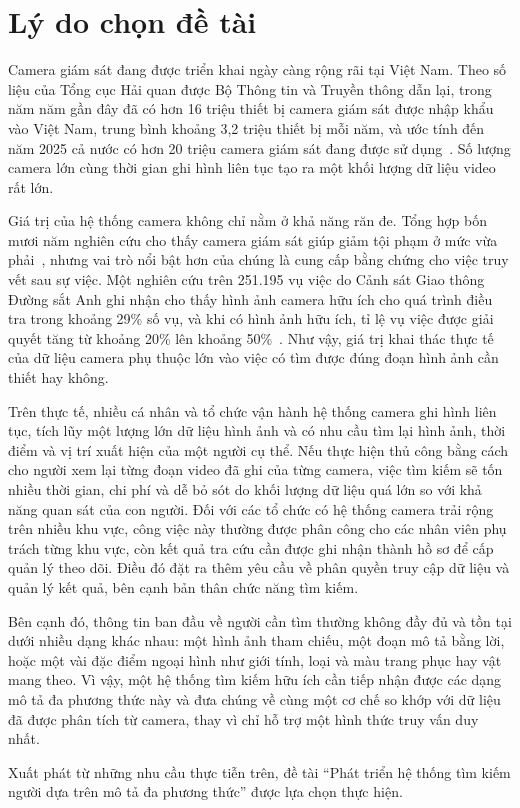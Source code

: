 \section{Lý do chọn đề tài}
\label{sec:1.1}

Camera giám sát đang được triển khai ngày càng rộng rãi tại Việt Nam. Theo số liệu của Tổng cục Hải quan được Bộ Thông tin và Truyền thông dẫn lại, trong năm năm gần đây đã có hơn 16 triệu thiết bị camera giám sát được nhập khẩu vào Việt Nam, trung bình khoảng 3,2 triệu thiết bị mỗi năm, và ước tính đến năm 2025 cả nước có hơn 20 triệu camera giám sát đang được sử dụng~\cite{vnexpress2024camera}. Số lượng camera lớn cùng thời gian ghi hình liên tục tạo ra một khối lượng dữ liệu video rất lớn.

Giá trị của hệ thống camera không chỉ nằm ở khả năng răn đe. Tổng hợp bốn mươi năm nghiên cứu cho thấy camera giám sát giúp giảm tội phạm ở mức vừa phải~\cite{piza2019cctv}, nhưng vai trò nổi bật hơn của chúng là cung cấp bằng chứng cho việc truy vết sau sự việc. Một nghiên cứu trên 251.195 vụ việc do Cảnh sát Giao thông Đường sắt Anh ghi nhận cho thấy hình ảnh camera hữu ích cho quá trình điều tra trong khoảng 29\% số vụ, và khi có hình ảnh hữu ích, tỉ lệ vụ việc được giải quyết tăng từ khoảng 20\% lên khoảng 50\%~\cite{ashby2017cctv}. Như vậy, giá trị khai thác thực tế của dữ liệu camera phụ thuộc lớn vào việc có tìm được đúng đoạn hình ảnh cần thiết hay không.

Trên thực tế, nhiều cá nhân và tổ chức vận hành hệ thống camera ghi hình liên tục, tích lũy một lượng lớn dữ liệu hình ảnh và có nhu cầu tìm lại hình ảnh, thời điểm và vị trí xuất hiện của một người cụ thể. Nếu thực hiện thủ công bằng cách cho người xem lại từng đoạn video đã ghi của từng camera, việc tìm kiếm sẽ tốn nhiều thời gian, chi phí và dễ bỏ sót do khối lượng dữ liệu quá lớn so với khả năng quan sát của con người. Đối với các tổ chức có hệ thống camera trải rộng trên nhiều khu vực, công việc này thường được phân công cho các nhân viên phụ trách từng khu vực, còn kết quả tra cứu cần được ghi nhận thành hồ sơ để cấp quản lý theo dõi. Điều đó đặt ra thêm yêu cầu về phân quyền truy cập dữ liệu và quản lý kết quả, bên cạnh bản thân chức năng tìm kiếm.

Bên cạnh đó, thông tin ban đầu về người cần tìm thường không đầy đủ và tồn tại dưới nhiều dạng khác nhau: một hình ảnh tham chiếu, một đoạn mô tả bằng lời, hoặc một vài đặc điểm ngoại hình như giới tính, loại và màu trang phục hay vật mang theo. Vì vậy, một hệ thống tìm kiếm hữu ích cần tiếp nhận được các dạng mô tả đa phương thức này và đưa chúng về cùng một cơ chế so khớp với dữ liệu đã được phân tích từ camera, thay vì chỉ hỗ trợ một hình thức truy vấn duy nhất.

Xuất phát từ những nhu cầu thực tiễn trên, đề tài ``Phát triển hệ thống tìm kiếm người dựa trên mô tả đa phương thức'' được lựa chọn thực hiện.
